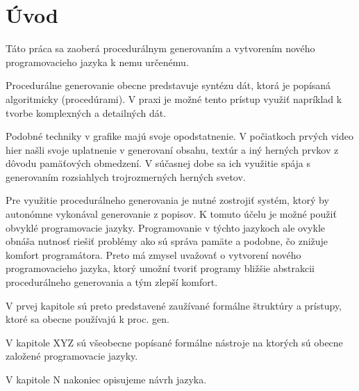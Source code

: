 

\chapter{Úvod}
Táto práca sa zaoberá procedurálnym generovaním a vytvorením nového programovacieho jazyka k nemu určenému.

Procedurálne generovanie obecne predstavuje syntézu dát, ktorá je popísaná algoritmicky (procedúrami).
V praxi je možné tento prístup využiť napríklad k tvorbe komplexných a detailných dát.

Podobné techniky v grafike majú svoje opodstatnenie. V počiatkoch prvých video hier našli svoje uplatnenie v generovaní obsahu, textúr a iný herných prvkov z dôvodu pamäťových obmedzení. 
V súčasnej dobe sa ich využitie spája s generovaním rozsiahlych trojrozmerných herných svetov.

Pre využitie procedurálneho generovania je nutné zostrojiť systém, ktorý by autonómne vykonával generovanie z popisov. K tomuto účelu je možné
použiť obvyklé programovacie jazyky. Programovanie v týchto jazykoch ale ovykle obnáša nutnosť riešiť problémy ako sú správa pamäte a podobne, čo znižuje komfort programátora.
Preto má zmysel uvažovať o vytvorení nového programovacieho jazyka, ktorý umožní tvoriť programy bližšie abstrakcii procedurálneho generovania 
a tým zlepší komfort.



V prvej kapitole sú preto predstavené zaužívané formálne štruktúry a prístupy, ktoré sa obecne používajú k proc. gen.

V kapitole XYZ sú všeobecne popísané formálne nástroje na ktorých sú obecne založené programovacie jazyky.

V kapitole N nakoniec opisujeme návrh jazyka.














